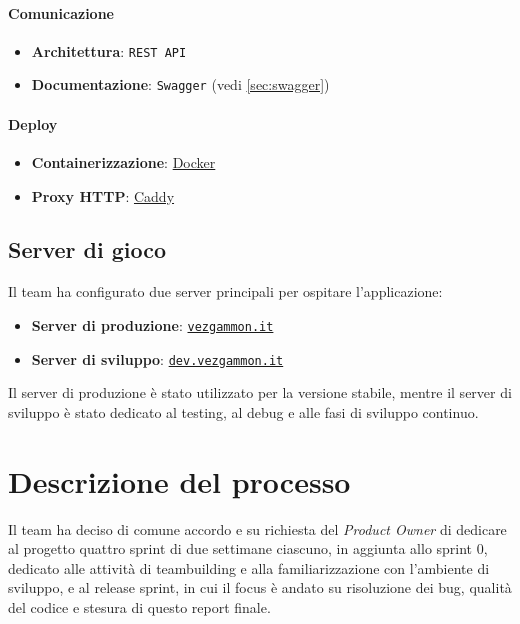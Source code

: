 \documentclass{article}
\begin{document}
\paragraph{Comunicazione}
\begin{itemize}
    \item \textbf{Architettura}: \texttt{REST API}
    \item \textbf{Documentazione}: \texttt{Swagger} (vedi \ref{sec:swagger})
\end{itemize}

\paragraph{Deploy}
\begin{itemize}
    \item \textbf{Containerizzazione}: \href{https://github.com/docker}{Docker}
    \item \textbf{Proxy HTTP}: \href{https://github.com/caddyserver/caddy}{Caddy}
\end{itemize}

\subsection{Server di gioco}

Il team ha configurato due server principali per ospitare l'applicazione:
\begin{itemize}
    \item \textbf{Server di produzione}: \href{https://vezgammon.it}{\texttt{vezgammon.it}}
    \item \textbf{Server di sviluppo}: \href{https://dev.vezgammon.it}{\texttt{dev.vezgammon.it}}
\end{itemize}
Il server di produzione è stato utilizzato per la versione stabile, mentre il server di sviluppo è stato dedicato al testing, 
al debug e alle fasi di sviluppo continuo.

\section{Descrizione del processo}

Il team ha deciso di comune accordo e su richiesta del \textit{Product Owner} di dedicare al progetto quattro sprint di due settimane 
ciascuno, in aggiunta allo sprint 0, dedicato alle attività di teambuilding e alla familiarizzazione con l'ambiente di sviluppo, e 
al release sprint, in cui il focus è andato su risoluzione dei bug, qualità del codice e stesura di questo report finale.
\end{document}
